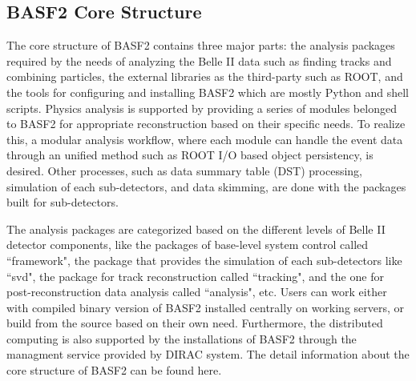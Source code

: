 
\subsection{BASF2 Core Structure}
The core structure of BASF2 contains three major parts: the analysis packages required by the needs of analyzing the Belle II data such as finding tracks and combining particles, the external libraries as the third-party such as ROOT, and the tools for configuring and installing BASF2 which are mostly Python and shell scripts. Physics analysis is supported by providing
a series of modules belonged to BASF2 for appropriate reconstruction based on their specific
needs. To realize this, a modular analysis workflow, where each module can handle the event
data through an unified method such as ROOT I/O based object persistency, is desired. Other
processes, such as data summary table (DST) processing, simulation of each sub-detectors, and data skimming, are done with the packages built for sub-detectors.

The analysis packages are categorized based on the different levels of Belle II detector components, like the packages of base-level system control called ``framework", the package that provides the simulation of each sub-detectors like ``svd",  the package for track reconstruction called ``tracking",  and the one for post-reconstruction data analysis called ``analysis", etc. Users can work either with compiled binary version of BASF2 installed centrally on working servers, or build from the source based on their own need. Furthermore, the distributed computing is also supported by the installations of BASF2 through the managment service provided by DIRAC system\cite{dirac}. The detail information about the core structure of BASF2 can be found here\cite{kuhr2019belle}. 




